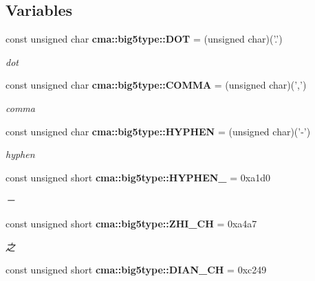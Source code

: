 \subsection*{Variables}
\begin{CompactItemize}
\item 
const unsigned char {\bf cma::big5type::DOT} = (unsigned char)('.')\label{namespacecma_1_1big5type_d58dfc7fdbe5d6db3b5b6dca9772457b}

\begin{CompactList}\small\item\em dot \item\end{CompactList}\item 
const unsigned char {\bf cma::big5type::COMMA} = (unsigned char)(',')\label{namespacecma_1_1big5type_a37bf289465759bf00ac522823ffe49a}

\begin{CompactList}\small\item\em comma \item\end{CompactList}\item 
const unsigned char {\bf cma::big5type::HYPHEN} = (unsigned char)('-')\label{namespacecma_1_1big5type_c0c4db6b61a12155ae0bf7094e687178}

\begin{CompactList}\small\item\em hyphen \item\end{CompactList}\item 
const unsigned short {\bf cma::big5type::HYPHEN\_} = 0xa1d0\label{namespacecma_1_1big5type_91487509f5a270ebc322475ec33f0a7a}

\begin{CompactList}\small\item\em － \item\end{CompactList}\item 
const unsigned short {\bf cma::big5type::ZHI\_\-CH} = 0xa4a7\label{namespacecma_1_1big5type_40ab6efe0f9da7cdd4ccb668839f189c}

\begin{CompactList}\small\item\em 之 \item\end{CompactList}\item 
const unsigned short {\bf cma::big5type::DIAN\_\-CH} = 0xc249\label{namespacecma_1_1big5type_c8d3c97e209a8e236d965b3caa12648b}


\end{CompactItemize}

